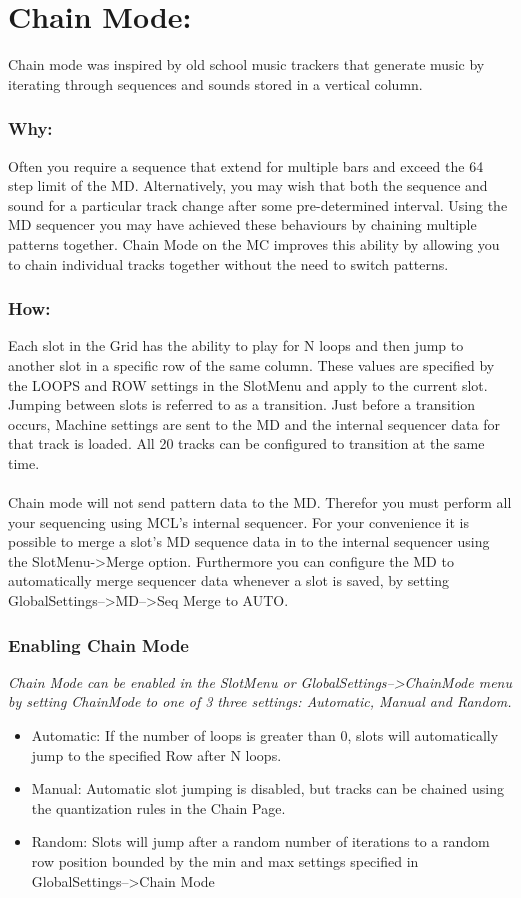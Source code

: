 \chapter{Chain Mode:}
Chain mode was inspired by old school music trackers that generate music by iterating through sequences and sounds stored in a vertical column.
\subsection{Why:}
Often you require a sequence that extend for multiple bars and exceed the 64 step limit of the MD. Alternatively, you may wish that both the sequence and sound for a particular track change after some pre-determined interval. Using the MD sequencer you may have achieved these behaviours by chaining multiple patterns together. Chain Mode on the MC improves this ability by allowing you to chain individual tracks together without the need to switch patterns.
\subsection{How:}
Each slot in the Grid has the ability to play for N loops and then jump to another slot in a specific row of the same column.  These values are specified by the LOOPS and ROW settings in the SlotMenu and apply to the current slot. Jumping between slots is referred to as a transition. Just before a transition occurs, Machine settings are sent to the MD and the internal sequencer data for that track is loaded. All 20 tracks can be configured to transition at the same time.\\
 \\
Chain mode will not send pattern data to the MD. Therefor you must perform all your sequencing using MCL's internal sequencer. For your convenience it is possible to merge a slot's MD sequence data in to the internal sequencer using the SlotMenu->Merge option. Furthermore you can configure the MD to automatically merge sequencer data whenever a slot is saved, by setting GlobalSettings-->MD-->Seq Merge to AUTO.
\subsection{Enabling Chain Mode}
\textit{ Chain Mode can be enabled in the SlotMenu or GlobalSettings-->ChainMode menu by setting ChainMode to one of 3 three settings: Automatic, Manual and Random.}

\begin{itemize}
	\item Automatic: If the number of loops is greater than 0, slots will automatically jump to the specified Row after N loops.
	\item Manual: Automatic slot jumping is disabled, but tracks can be chained using the quantization rules in the Chain Page.
	\item Random: Slots will jump after a random number of iterations to a random row position bounded by the min and max settings specified in GlobalSettings-->Chain Mode
\end{itemize}


